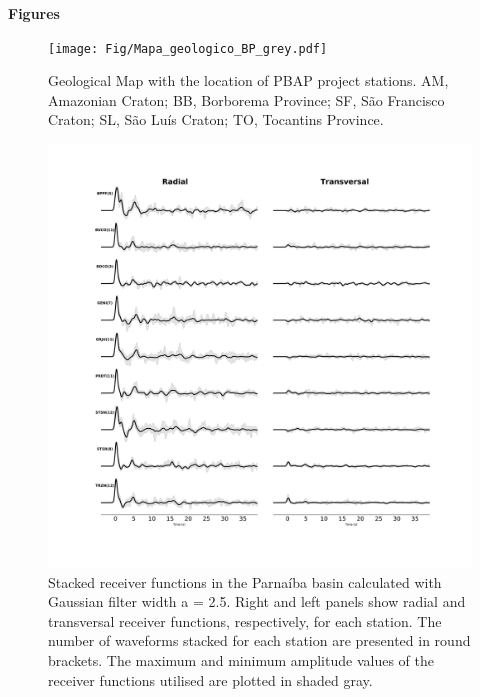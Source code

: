 \documentclass[paper,11pt]{geophysics}
\begin{document}
\pagebreak

\begin{flushleft}
\textbf{\LARGE Figures}
\end{flushleft}


\begin{figure}[!ht]
\begin{center}
\texttt{[image: Fig/Mapa\_geologico\_BP\_grey.pdf]}
\caption{Geological Map with the location of PBAP project stations. AM, Amazonian Craton; BB, Borborema Province; SF, São Francisco Craton; SL, São Luís Craton; TO, Tocantins Province.}
\label{mapa_estacoes_geologico}
\end{center}
\end{figure}


\begin{figure}[!ht]
\begin{center}
\includegraphics[width=\textwidth]{Fig/stations_FR.pdf}
\caption{Stacked receiver functions in the Parnaíba basin calculated with Gaussian filter width a = 2.5. Right and left panels show radial and transversal receiver functions, respectively, for each station. The number of waveforms stacked for each station are presented in round brackets. The maximum and minimum amplitude values of the receiver functions utilised are plotted in shaded gray.}
\label{estations_FR}
\end{center}
\end{figure}
\end{document}
